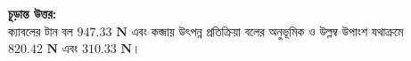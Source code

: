 \documentclass[12pt, a4paper]{article}
\begin{document}
\begin{tcolorbox}[solutionbox={সমাধান (Solution)}]
\vspace{1em}
\begin{tcolorbox}[answerbox]
\textbf{চূড়ান্ত উত্তর:} \\
ক্যাবলের টান বল $\mathbf{947.33\text{ N}}$ এবং কব্জায় উৎপন্ন প্রতিক্রিয়া বলের অনুভূমিক ও উল্লম্ব উপাংশ যথাক্রমে $\mathbf{820.42\text{ N}}$ এবং $\mathbf{310.33\text{ N}}$।
\end{tcolorbox}
\end{tcolorbox}
\end{document}
